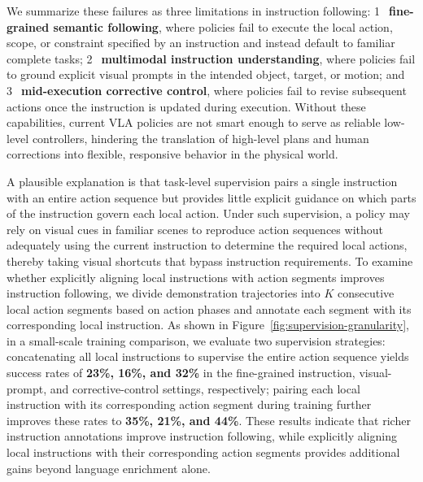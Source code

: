 We summarize these failures as three limitations in instruction following:
\textcircled{1}~\textbf{fine-grained semantic following}, where policies fail to execute the local
action, scope, or constraint specified by an instruction and instead default to familiar complete
tasks; \textcircled{2}~\textbf{multimodal instruction understanding}, where policies fail to ground
explicit visual prompts in the intended object, target, or motion; and
\textcircled{3}~\textbf{mid-execution corrective control}, where policies fail to revise subsequent
actions once the instruction is updated during execution. Without these capabilities, current VLA
policies are not smart enough to serve as reliable low-level controllers, hindering the translation
of high-level plans and human corrections into flexible, responsive behavior in the physical world.

%

%
A plausible explanation is that task-level supervision pairs a single instruction with an entire
action sequence but provides little explicit guidance on which parts of the instruction govern
each local action. Under such supervision, a policy may rely on visual cues in familiar scenes to
reproduce action sequences without adequately using the current instruction to determine the
required local actions, thereby taking visual shortcuts that bypass instruction requirements. To
examine whether explicitly aligning local instructions with action segments improves instruction
following, we divide demonstration trajectories into $K$ consecutive local action segments based on
action phases and annotate each segment with its corresponding local instruction. As shown in
Figure~\ref{fig:supervision-granularity}, in a small-scale training comparison, we evaluate two
supervision strategies: concatenating all local instructions to supervise the entire action sequence
yields success rates of \textbf{23\%, 16\%, and 32\%} in the
fine-grained instruction, visual-prompt, and corrective-control settings, respectively; pairing each
local instruction with its corresponding action segment during training further improves these rates
to \textbf{35\%, 21\%, and 44\%}. These results indicate that richer instruction annotations improve
instruction following, while explicitly aligning local instructions with their corresponding action
segments provides additional gains beyond language enrichment alone.

